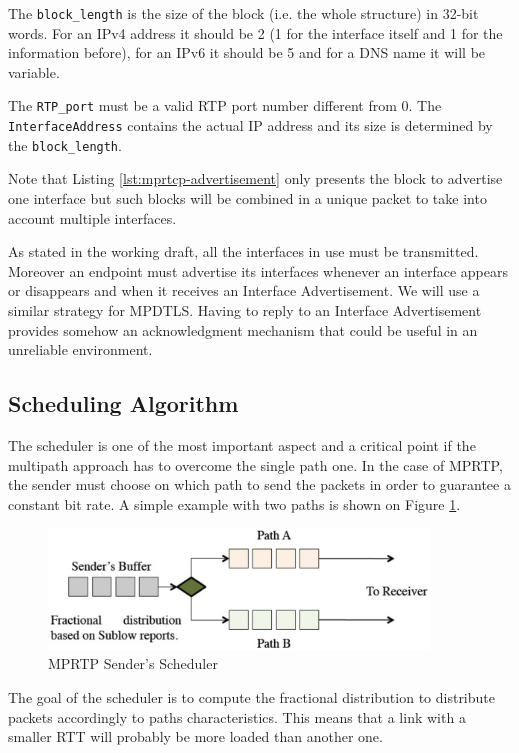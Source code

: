The \texttt{block\_length} is the size of the block (i.e. the whole structure) in 32-bit words. For an IPv4 address it should be 2 (1 for the interface itself and 1 for the information before), for an IPv6 it should be 5 and for a DNS name it will be variable.

The \texttt{RTP\_port} must be a valid RTP port number different from 0. The \texttt{InterfaceAddress} contains the actual IP address and its size is determined by the \texttt{block\_length}.

Note that Listing \ref{lst:mprtcp-advertisement} only presents the block to advertise one interface but such blocks will be combined in a unique packet to take into account multiple interfaces.

As stated in the working draft, all the interfaces in use must be transmitted. Moreover an endpoint must advertise its interfaces whenever an interface appears or disappears and when it receives an Interface Advertisement. We will use a similar strategy for MPDTLS. Having to reply to an Interface Advertisement provides somehow an acknowledgment mechanism that could be useful in an unreliable environment.

\subsection{Scheduling Algorithm}

The scheduler is one of the most important aspect and a critical point if the multipath approach has to overcome the single path one. In the case of MPRTP, the sender must choose on which path to send the packets in order to guarantee a constant bit rate. A simple example with two paths is shown on Figure \ref{fig:mprtp-scheduler}.

\begin{figure}[!ht]
\centering
\includegraphics[width=0.9\textwidth]{images/mprtp-scheduler}
\caption{MPRTP Sender's Scheduler}
\label{fig:mprtp-scheduler}
\end{figure}

The goal of the scheduler is to compute the fractional distribution to distribute packets accordingly to paths characteristics. This means that a link with a smaller RTT will probably be more loaded than another one.

